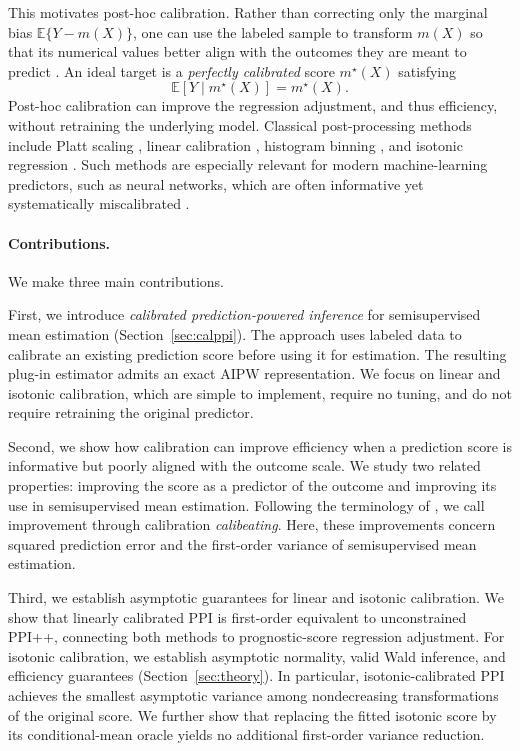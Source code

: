 \documentclass{article}
\theoremstyle{plain}
\theoremstyle{definition}
\newcommand{\E}{\mathbb{E}}
\newcommand{\1}{\mathbbm{1}}
\begin{document}
This motivates post-hoc calibration. Rather than correcting only the marginal bias \(\E\{Y-m(X)\}\), one can use the labeled sample to transform \(m(X)\) so that its numerical values better align with the outcomes they are meant to predict \citep{zadrozny2001obtaining,zadrozny2002transforming,niculescu2005predicting}. An ideal target is a \textit{perfectly calibrated} score \(m^\star(X)\) satisfying
\[
\E\!\left[Y \mid m^\star(X)\right] = m^\star(X).
\]
Post-hoc calibration can improve the regression adjustment, and thus efficiency, without retraining the underlying model. Classical post-processing methods include Platt scaling \citep{platt1999probabilistic}, linear calibration \citep{mincer1969evaluation}, histogram binning \citep{zadrozny2001obtaining}, and isotonic regression \citep{zadrozny2002transforming}. Such methods are especially relevant for modern machine-learning predictors, such as neural networks, which are often informative yet systematically miscalibrated \citep{bella2010calibration,guo2017calibration,wang2023calibration}.

\paragraph{Contributions.}
We make three main contributions.

First, we introduce \emph{calibrated prediction-powered inference}
for semisupervised mean estimation (Section~\ref{sec:calppi}).
The approach uses labeled data to calibrate an existing
prediction score before using it for estimation. The resulting
plug-in estimator admits an exact AIPW representation.
We focus on linear and isotonic calibration, which are
simple to implement, require no tuning, and do not require
retraining the original predictor.

Second, we show how calibration can improve efficiency when
a prediction score is informative but poorly aligned with
the outcome scale. We study two related properties:
improving the score as a predictor of the outcome and
improving its use in semisupervised mean estimation.
Following the terminology of \citet{foster2023calibeating},
we call improvement through calibration \emph{calibeating}.
Here, these improvements concern squared prediction error
and the first-order variance of semisupervised mean estimation.

Third, we establish asymptotic guarantees for linear and
isotonic calibration. We show that linearly calibrated PPI
is first-order equivalent to unconstrained PPI++, connecting
both methods to prognostic-score regression adjustment.
For isotonic calibration, we establish asymptotic normality,
valid Wald inference, and efficiency guarantees
(Section~\ref{sec:theory}). In particular, isotonic-calibrated
PPI achieves the smallest asymptotic variance among
nondecreasing transformations of the original score. We further
show that replacing the fitted isotonic score by its
conditional-mean oracle yields no additional first-order variance reduction.
\end{document}
